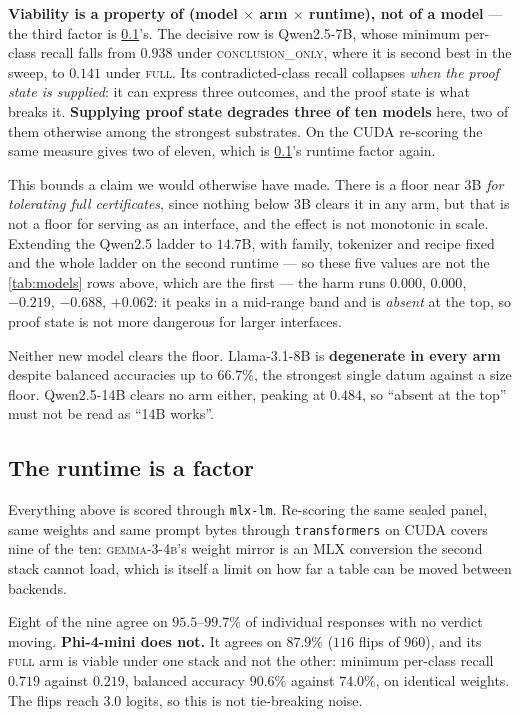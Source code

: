 \documentclass[10pt,twocolumn]{article}
\begin{document}
\textbf{Viability is a property of (model $\times$ arm $\times$ runtime), not of
a model} --- the third factor is \cref{sec:runtime}'s. The decisive row is Qwen2.5-7B, whose minimum per-class recall falls from
$0.938$ under \textsc{conclusion\_only}, where it is second best in the sweep, to
$0.141$ under \textsc{full}. Its contradicted-class recall collapses \emph{when the proof
state is supplied}: it can express three outcomes, and the proof state is what breaks it. \textbf{Supplying proof state degrades three of ten
models} here, two of them otherwise among the strongest substrates. On the CUDA re-scoring the same measure gives two of eleven, which is
\cref{sec:runtime}'s runtime factor again.

This bounds a claim we would otherwise have made. There is a floor near 3B \emph{for tolerating full certificates}, since nothing
below $3$B clears it in any arm, but
that is not a floor for serving as an interface, and the effect is not monotonic
in scale. Extending the Qwen2.5 ladder to $14.7$B, with family, tokenizer and recipe fixed
and the whole ladder on the second runtime --- so these five values are not the
\cref{tab:models} rows above, which are the first --- the harm runs $0.000$, $0.000$, $-0.219$, $-0.688$, $+0.062$: it peaks in a mid-range
band and is \emph{absent} at the top, so proof state is not more dangerous for
larger interfaces.

Neither new model clears the floor. Llama-3.1-8B is \textbf{degenerate in every arm} despite balanced accuracies up
to $66.7\%$, the strongest single datum against a size floor. Qwen2.5-14B clears no arm either, peaking at $0.484$, so ``absent at the
top'' must not be read as ``14B works''. 

\subsection{The runtime is a factor}
\label{sec:runtime}

Everything above is scored through \texttt{mlx-lm}. Re-scoring the same sealed
panel, same weights and same prompt bytes through \texttt{transformers} on CUDA
covers nine of the ten: \textsc{gemma-3-4b}'s weight mirror is an MLX conversion
the second stack cannot load, which is itself a limit on how far a table can be
moved between backends.

Eight of the nine agree on $95.5$--$99.7\%$ of individual responses with no
verdict moving. \textbf{Phi-4-mini does not.} It agrees on $87.9\%$ ($116$ flips of $960$), and its \textsc{full} arm is viable under one stack and not
the other: minimum per-class recall $0.719$ against $0.219$, balanced accuracy
$90.6\%$ against $74.0\%$, on identical weights. The flips reach $3.0$ logits, so this is not tie-breaking noise.
\end{document}
